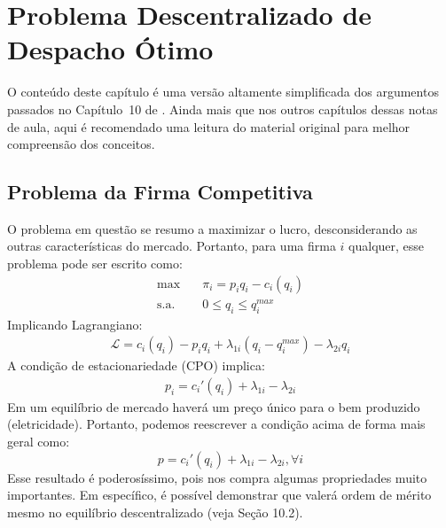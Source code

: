 \chapter{Problema Descentralizado de Despacho Ótimo}
\localtableofcontents 

O conteúdo deste capítulo é uma versão altamente simplificada dos argumentos passados no Capítulo~10 de \textcite{cretì_fontini_2019}. Ainda mais que nos outros capítulos dessas notas de aula, aqui é recomendado uma leitura do material original para melhor compreensão dos conceitos.

\section{Problema da Firma Competitiva}
O problema em questão se resumo a maximizar o lucro, desconsiderando as outras características do mercado. Portanto, para uma firma $i$ qualquer, esse problema pode ser escrito como:
\begin{align*}
    \max&\quad \pi_i=p_iq_i-c_i(q_i)\\
    \text{s.a.}&\quad 0\le q_i\leq q_i^{max}
\end{align*}
Implicando Lagrangiano:
\begin{align*}
    \mathcal{L} = c_i(q_i)-p_iq_i + \lambda_{1i}(q_i-q_i^{max}) - \lambda_{2i}q_i
\end{align*}
A condição de estacionariedade (CPO) implica:
\begin{align*}
    p_i = c_i'(q_i)+\lambda_{1i}-\lambda_{2i}
\end{align*}
Em um equilíbrio de mercado haverá um preço único para o bem produzido (eletricidade). Portanto, podemos reescrever a condição acima de forma mais geral como:
\[p=c_i'(q_i)+\lambda_{1i}-\lambda_{2i}, \forall i\]
Esse resultado é poderosíssimo, pois nos compra algumas propriedades muito importantes. Em específico, é possível demonstrar que valerá ordem de mérito mesmo no equilíbrio descentralizado (veja \textcite{cretì_fontini_2019} Seção 10.2).

